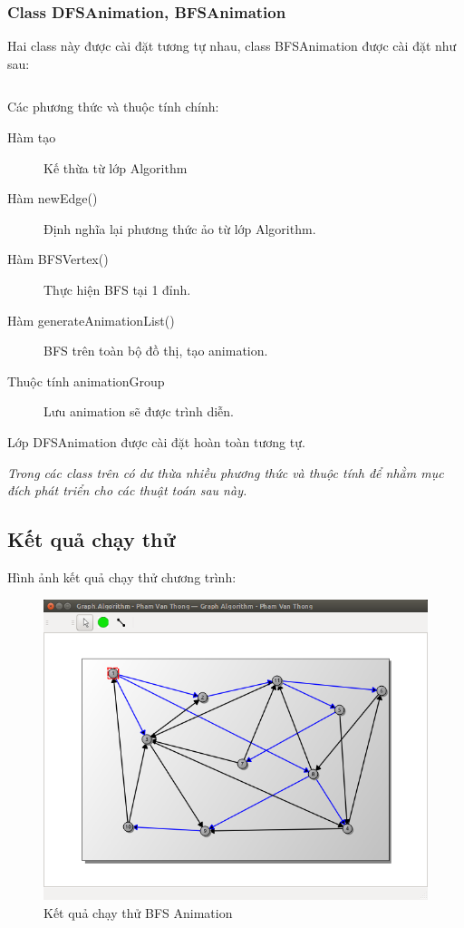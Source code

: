 \documentclass[a4paper,10pt]{article}
\newcommand{\mnt}[1]{\inputminted[frame=single, linenos=true, tabsize=4]{c++}{#1}}
\begin{document}
\subsubsection{Class DFSAnimation, BFSAnimation}

Hai class này được cài đặt tương tự nhau, class BFSAnimation được cài đặt như sau:
\mnt{images/bfs.h}

Các phương thức và thuộc tính chính:
\begin{description}
\item[Hàm tạo] Kế thừa từ lớp Algorithm 
\item[Hàm newEdge()] Định nghĩa lại phương thức ảo từ lớp Algorithm.
\item[Hàm BFSVertex()] Thực hiện BFS tại 1 đỉnh.
\item[Hàm generateAnimationList()] BFS trên toàn bộ đồ thị, tạo animation.
\item[Thuộc tính animationGroup] Lưu animation sẽ được trình diễn.
\end{description}

Lớp DFSAnimation được cài đặt hoàn toàn tương tự.


\emph{Trong các class trên có dư thừa nhiều phương thức và thuộc tính để nhằm mục đích phát triển cho các thuật toán sau này.}

\subsection{Kết quả chạy thử}
Hình ảnh kết quả chạy thử chương trình:
\begin{figure}[h!]
  \centering
  \includegraphics[scale=0.5]{images/pic6.png}
  \caption{Kết quả chạy thử BFS Animation}
\end{figure}
\end{document}
